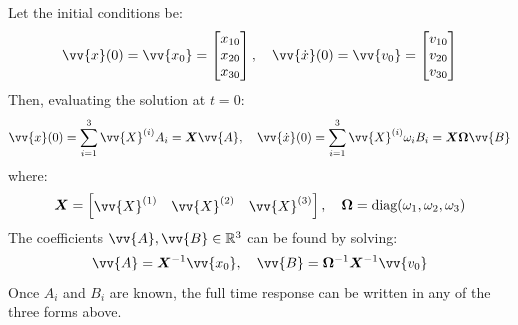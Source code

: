 Let the initial conditions be:
\[
\vv{x}(0) = \vv{x_0} =
\begin{bmatrix}
x_{10} \\
x_{20} \\
x_{30}
\end{bmatrix}, \quad
\vv{\dot{x}}(0) = \vv{v_0} =
\begin{bmatrix}
v_{10} \\
v_{20} \\
v_{30}
\end{bmatrix}
\]
Then, evaluating the solution at \( t = 0 \):
\[
\vv{x}(0) = \sum_{i=1}^3 \vv{X}^{(i)} A_i = \boldsymbol{X} \vv{A}, \quad
\vv{\dot{x}}(0) = \sum_{i=1}^3 \vv{X}^{(i)} \omega_i B_i = \boldsymbol{X}  \boldsymbol{\Omega} \vv{B}
\]
where:
\[
\boldsymbol{X} = \begin{bmatrix}
\vv{X}^{(1)} & \vv{X}^{(2)} & \vv{X}^{(3)}
\end{bmatrix}, \quad
\boldsymbol{\Omega} = \text{diag}(\omega_1, \omega_2, \omega_3)
\]
The coefficients \( \vv{A}, \vv{B} \in \mathbb{R}^3 \) can be found by solving:
\[
\vv{A} = \boldsymbol{X}^{-1} \vv{x_0}, \quad \vv{B} = \boldsymbol{\Omega}^{-1} \boldsymbol{X}^{-1} \vv{v_0}
\]
Once \( A_i \) and \( B_i \) are known, the full time response can be written in any of the three forms above.

